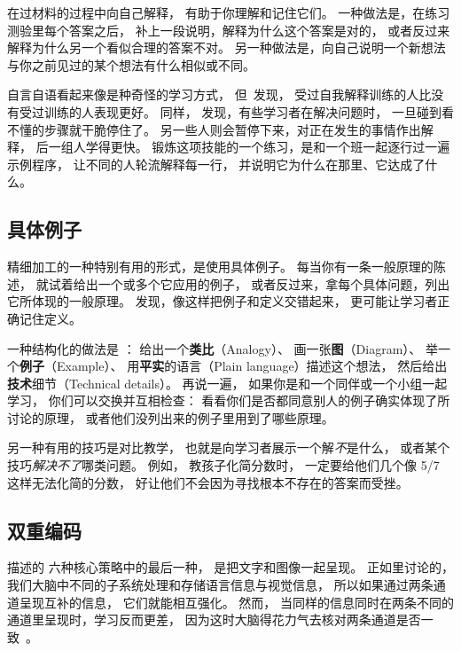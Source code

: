 在过材料的过程中向自己解释，
有助于你理解和记住它们。
一种做法是，在练习测验里每个答案之后，
补上一段说明，解释为什么这个答案是对的，
或者反过来解释为什么另一个看似合理的答案不对。
另一种做法是，向自己说明一个新想法
与你之前见过的某个想法有什么相似或不同。

自言自语看起来像是种奇怪的学习方式，
但~\cite{Biel1995}发现，
受过自我解释训练的人比没有受过训练的人表现更好。
同样，
\cite{Chi1989}发现，有些学习者在解决问题时，
一旦碰到看不懂的步骤就干脆停住了。
另一些人则会暂停下来，对正在发生的事情作出解释，
后一组人学得更快。
锻炼这项技能的一个练习，是和一个班一起逐行过一遍示例程序，
让不同的人轮流解释每一行，
并说明它为什么在那里、它达成了什么。

\subsection*{具体例子}

精细加工的一种特别有用的形式，是使用具体例子。
每当你有一条一般原理的陈述，
就试着给出一个或多个它应用的例子，
或者反过来，拿每个具体问题，列出它所体现的一般原理。
\cite{Raws2014}发现，像这样把例子和定义交错起来，
更可能让学习者正确记住定义。

一种结构化的做法是
：
给出一个\textbf{类比}（Analogy）、
画一张\textbf{图}（Diagram）、
举一个\textbf{例子}（Example）、
用\textbf{平实}的语言（Plain language）描述这个想法，
然后给出\textbf{技术}细节（Technical details）。
再说一遍，
如果你是和一个同伴或一个小组一起学习，
你们可以交换并互相检查：
看看你们是否都同意别人的例子确实体现了所讨论的原理，
或者他们没列出来的例子里用到了哪些原理。

另一种有用的技巧是对比教学，
也就是向学习者展示一个解\emph{不}是什么，
或者某个技巧\emph{解决不了}哪类问题。
例如，
教孩子化简分数时，
一定要给他们几个像 5/7 这样无法化简的分数，
好让他们不会因为寻找根本不存在的答案而受挫。

\subsection*{双重编码}

 描述的
六种核心策略中的最后一种，
是把文字和图像一起呈现。
正如里讨论的，
我们大脑中不同的子系统处理和存储语言信息与视觉信息，
所以如果通过两条通道呈现互补的信息，
它们就能相互强化。
然而，
当同样的信息同时在两条不同的通道里呈现时，学习反而更差，
因为这时大脑得花力气去核对两条通道是否一致~\cite{Maye2003}。

